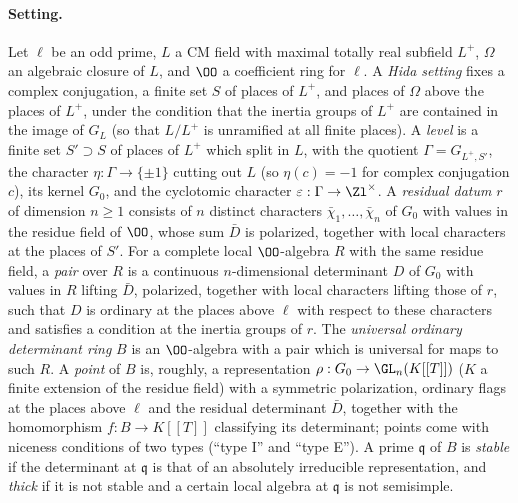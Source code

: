 \paragraph{Setting.} Let $\ell$ be an odd prime, $L$ a CM field with maximal totally real subfield $L^+$, $\Omega$ an algebraic closure of
$L$, and $\OO$ a coefficient ring for $\ell$. A \emph{Hida setting} fixes a complex conjugation, a finite set $S$ of places of $L^+$, and places of
$\Omega$ above the places of $L^+$, under the condition that the inertia groups of $L^+$ are contained in the image of $G_L$ (so that $L/L^+$ is
unramified at all finite places). A \emph{level} is a finite set $S'\supset S$ of places of $L^+$ which split in $L$, with the quotient
$\Gamma=G_{L^+,S'}$, the character $\eta:\Gamma\to\{\pm1\}$ cutting out $L$ (so $\eta(c)=-1$ for complex conjugation $c$), its kernel $G_0$, and the
cyclotomic character $\varepsilon:\Gamma\to\Zl^\times$. A \emph{residual datum} $r$ of dimension $n\ge1$ consists of $n$ distinct characters
$\bar\chi_1,\dots,\bar\chi_n$ of $G_0$ with values in the residue field of $\OO$, whose sum $\bar D$ is polarized, together with local characters at
the places of $S'$. For a complete local $\OO$-algebra $R$ with the same residue field, a \emph{pair} over $R$ is a continuous $n$-dimensional determinant
$D$ of $G_0$ with values in $R$ lifting $\bar D$, polarized, together with local characters lifting those of $r$, such that $D$ is ordinary at the places
above $\ell$ with respect to these characters and satisfies a condition at the inertia groups of $r$. The \emph{universal ordinary determinant ring} $B$ is
an $\OO$-algebra with a pair which is universal for maps to such $R$. A \emph{point} of $B$ is, roughly, a representation
$\rho:G_0\to\GL_n(K[[T]])$ ($K$ a finite extension of the residue field) with a symmetric polarization, ordinary flags at the places above $\ell$ and
the residual determinant $\bar D$, together with the homomorphism $f:B\to K[[T]]$ classifying its determinant; points come with niceness conditions of
two types (``type I'' and ``type E''). A prime $\mathfrak q$ of $B$ is \emph{stable} if the determinant at $\mathfrak q$ is that of an absolutely
irreducible representation, and \emph{thick} if it is not stable and a certain local algebra at $\mathfrak q$ is not semisimple.

